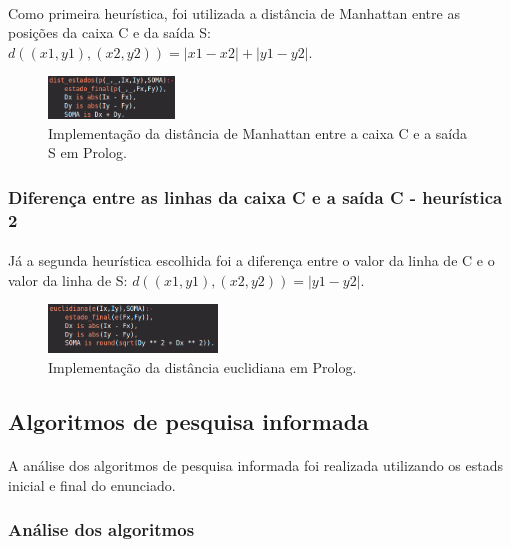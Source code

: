 \documentclass{article}
\begin{document}
\paragraph{} Como primeira heurística, foi utilizada a distância de Manhattan entre as posições da caixa C e da saída S: $d((x1, y1), (x2, y2)) = |x1 - x2| + |y1 - y2|$.

\begin{figure}[h]
\centering
\includegraphics[width=0.3\textwidth]{estados.png}
\caption{\label{fig:man}Implementação da distância de Manhattan entre a caixa C e a saída S em Prolog.}
\end{figure}

\newpage

\subsubsection{Diferença entre as linhas da caixa C e a saída C - heurística 2}
\paragraph{} Já a segunda heurística escolhida foi a diferença entre o valor da linha de C e o valor da linha de S: $d((x1, y1), (x2, y2)) = |y1 - y2|$.

\begin{figure}[h]
\centering
\includegraphics[width=0.4\textwidth]{euclidiana.png}
\caption{\label{fig:euc}Implementação da distância euclidiana em Prolog.}
\end{figure}

\subsection{Algoritmos de pesquisa informada}
\paragraph{} A análise dos algoritmos de pesquisa informada foi realizada utilizando os estads inicial e final do enunciado.
\subsubsection{Análise dos algoritmos}
\end{document}
